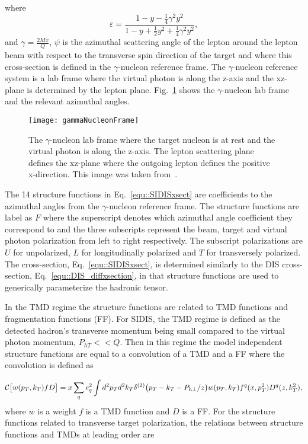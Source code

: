 \noindent
where
\begin{equation}
  \varepsilon =
  \frac{1-y-\frac{1}{4}\gamma^2y^2}{1-y+\frac{1}{2}y^2+\frac{1}{4}\gamma^2y^2},
\end{equation}
\noindent
and $\gamma = \frac{2Mx}{Q}$, $\psi$ is the azimuthal scattering angle of the
lepton around the lepton beam with respect to the transverse spin direction of
the target and where this cross-section is defined in the $\gamma$-nucleon
reference frame.  The $\gamma$-nucleon reference system is a lab frame where
the virtual photon is along the z-axis and the xz-plane is determined by the
lepton plane.  Fig.~\ref{fig::gammaNucleonFrame} shows the $\gamma$-nucleon lab
frame and the relevant azimuthal angles.

\begin{figure}[h!t]
  \centering \texttt{[image: gammaNucleonFrame]}
  \caption{The $\gamma$-nucleon lab frame where the target nucleon is at rest
    and the virtual photon is along the z-axis.  The lepton scattering plane
    defines the xz-plane where the outgoing lepton defines the positive
    x-direction.  This image was taken from~\cite{Bacchetta:2006tn}.}
  \label{fig::gammaNucleonFrame}
\end{figure}

The 14 structure functions in Eq.~\ref{equ::SIDISxsect} are coefficients to the
azimuthal angles from the $\gamma$-nucleon reference frame.  The structure
functions are label as $F$ where the superscript denotes which azimuthal angle
coefficient they correspond to and the three subscripts represent the beam,
target and virtual photon polarization from left to right respectively.  The
subscript polarizations are $U$ for unpolarized, $L$ for longitudinally
polarized and $T$ for transversely polarized.  The cross-section,
Eq.~\ref{equ::SIDISxsect}, is determined similarly to the DIS
cross-section, Eq.~\ref{equ::DIS_diffxsection}, in that structure functions are
used to generically parameterize the hadronic tensor.

In the TMD regime the structure functions are related to TMD functions and
fragmentation functions (FF).  For SIDIS, the TMD regime is defined as the
detected hadron's transverse momentum being small compared to the virtual photon
momentum, $P_{hT} << Q$.  Then in this regime the model independent structure
functions are equal to a convolution of a TMD and a FF where the
convolution is defined as

\begin{equation}
  \label{equ::SIDIS_conv}
{\cal C}\bigl[ w(p_T,k_T) f D \bigr] = x \sum_q e_q^2 \int d^2 p_T d^2 k_T
\delta^{(2)}\bigl(p_T - k_T - P_{h \perp}/z \bigr) w(p_T,k_T)
f^q(x,p_T^2)D^q(z,k_T^2),
\end{equation}
\noindent
where $w$ is a weight $f$ is a TMD function and $D$ is a FF.  For the structure
functions related to transverse target polarization, the relations between
structure functions and TMDs at leading order are~\cite{Bacchetta:2006tn}

